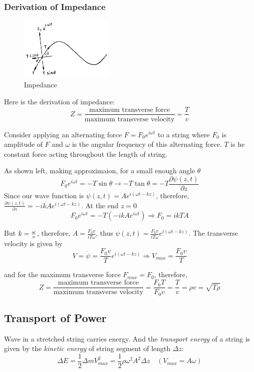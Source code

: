 \documentclass[UTF8]{book}
\begin{document}
\subsubsection{Derivation of Impedance}
\begin{figure}
  \vspace{-20pt}  
  \begin{center}
    \includegraphics[width=0.4\textwidth]{Figure/5.PNG}
  \end{center}
  \vspace{-20pt}    
  \caption{Impedance}
\end{figure}
Here is the derivation of impedance:
\[Z=\frac{\text{maximum transverse force}}{\text{maximum transverse velocity}}=\frac{T}{v}\]

Consider applying an alternating force $F=F_0e^{i\omega t}$ to a string where $F_0$ is amplitude of $F$ and $\omega $ is the angular frequency of this alternating force. $T$ is he constant force acting throughout the length of string. 

As shown left, making approximaion, for a small enough angle $\theta $
\[F_0e^{i\omega t}=-T\sin \theta \to -T\tan \theta =-T\frac{\partial \psi (z,t)}{\partial z}\]
Since our wave function is $\psi (z,t)=Ae^{i(\omega t-kz)}$, therefore, $\frac{\partial \psi (z,t)}{\partial z}=-ikAe^{i(\omega t-kz)}$. At the end $z=0$
\[F_0e^{i\omega t}=-T\left(-ikAe^{i\omega t}\right)\Rightarrow F_0=ikTA\]

But $k={\omega \over v}$, therefore, $A=\frac{F_0v}{iT\omega }$, thus $\psi (z,t)=\frac{F_0v}{iT\omega }e^{i(\omega t-kz )}$. The transverse velocity is given by
\[V=\dot{\psi }=\frac{F_0v}{T}e^{i(\omega t-kz )}\Rightarrow V_{max}=\frac{F_0v}{T}\]

and for the maximum transverse force $F_{max}=F_0$, therefore, 
\[Z=\frac{\text{maximum transverse force}}{\text{maximum transverse velocity}}=\frac{F_0T}{F_0v}=\frac{T}{v}=\rho v=\sqrt{T\rho }\] 
\subsection{Transport of Power}
Wave in a stretched string carries energy. And the \emph{transport energy} of a string is given by the \emph{kinetic energy} of string segment of length $\Delta z$:
\[\Delta E=\frac{1}{2}\Delta mV_{max}^2=\frac{1}{2}\rho \omega ^2A^2\Delta z\quad (V_{max}=A\omega )\]
\end{document}
